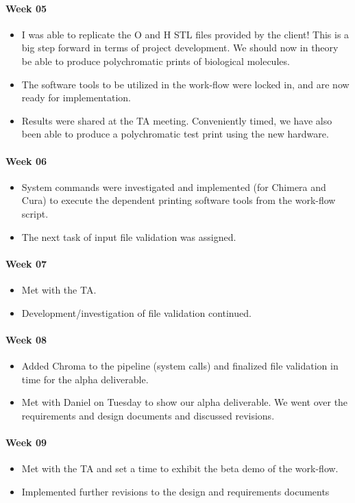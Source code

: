 \paragraph{Week 05}
\begin{itemize}
\item I was able to replicate the O and H STL files provided by the client! This is a big step forward in terms of project development. We should now in theory be able to produce polychromatic prints of biological molecules.
\item The software tools to be utilized in the work-flow were locked in, and are now ready for implementation.
\item Results were shared at the TA meeting. Conveniently timed, we have also been able to produce a polychromatic test print using the new hardware.
\end{itemize}
\paragraph{Week 06}
\begin{itemize}
\item System commands were investigated and implemented (for Chimera and Cura) to execute the dependent printing software tools from the work-flow script.
\item The next task of input file validation was assigned.
\end{itemize}
\paragraph{Week 07}
\begin{itemize}
\item Met with the TA.
\item Development/investigation of file validation continued.
\end{itemize}
\paragraph{Week 08}
\begin{itemize}
\item Added Chroma to the pipeline (system calls) and finalized file validation in time for the alpha deliverable.
\item Met with Daniel on Tuesday to show our alpha deliverable. We went over the requirements and design documents and discussed revisions. 
\end{itemize}
\paragraph{Week 09}
\begin{itemize}
\item Met with the TA and set a time to exhibit the beta demo of the work-flow.
\item Implemented further revisions to the design and requirements documents
\end{itemize}
